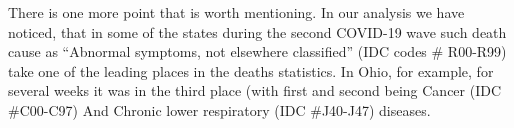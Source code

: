 \documentclass[conference]{IEEEtran}
\begin{document}
There is one more point that is worth mentioning. In our analysis we have noticed, that in some of the states during the second COVID-19 wave such death cause as “Abnormal symptoms, not elsewhere classified” (IDC codes \# R00-R99) take one of the leading places in the deaths statistics. In Ohio, for example, for several weeks it was in the third place (with first and second being Cancer (IDC \#C00-C97) And Chronic lower respiratory (IDC \#J40-J47) diseases.





\end{document}
